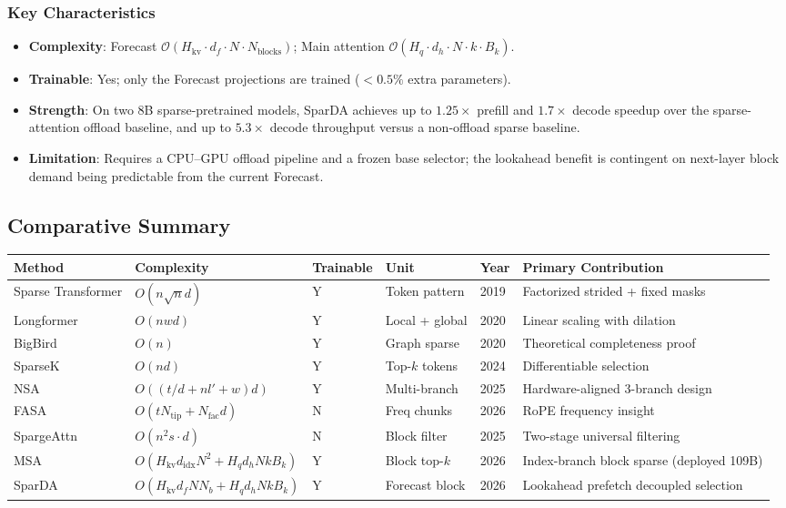 \subsubsection{Key Characteristics}

\begin{itemize}[leftmargin=*]
    \item \textbf{Complexity}: Forecast $\mathcal{O}(H_{\text{kv}} \cdot d_f \cdot N \cdot N_{\text{blocks}})$; Main attention $\mathcal{O}(H_q \cdot d_h \cdot N \cdot k \cdot B_k)$.
    \item \textbf{Trainable}: Yes; only the Forecast projections are trained ($<0.5\%$ extra parameters).
    \item \textbf{Strength}: On two 8B sparse-pretrained models, SparDA achieves up to $1.25\times$ prefill and $1.7\times$ decode speedup over the sparse-attention offload baseline, and up to $5.3\times$ decode throughput versus a non-offload sparse baseline.
    \item \textbf{Limitation}: Requires a CPU--GPU offload pipeline and a frozen base selector; the lookahead benefit is contingent on next-layer block demand being predictable from the current Forecast.
\end{itemize}

\subsection{Comparative Summary}

\footnotesize
\begin{longtable}{p{1.9cm}p{1.7cm}p{1.6cm}p{1.6cm}p{1.1cm}p{3.5cm}}
\toprule
\textbf{Method} & \textbf{Complexity} & \textbf{Trainable} & \textbf{Unit} & \textbf{Year} & \textbf{Primary Contribution} \\
\midrule
\endhead
Sparse Transformer & $O(n\sqrt{n}d)$ & Y & Token pattern & 2019 & Factorized strided + fixed masks \\
Longformer & $O(nwd)$ & Y & Local + global & 2020 & Linear scaling with dilation \\
BigBird & $O(n)$ & Y & Graph sparse & 2020 & Theoretical completeness proof \\
SparseK & $O(nd)$ & Y & Top-$k$ tokens & 2024 & Differentiable selection \\
NSA & $O((t/d+nl'+w)d)$ & Y & Multi-branch & 2025 & Hardware-aligned 3-branch design \\
FASA & $O(tN_{\text{tip}}+N_{\text{fac}}d)$ & N & Freq chunks & 2026 & RoPE frequency insight \\
SpargeAttn & $O(n^2 s \cdot d)$ & N & Block filter & 2025 & Two-stage universal filtering \\
MSA & $O(H_{\text{kv}}d_{\text{idx}}N^2 + H_q d_h N k B_k)$ & Y & Block top-$k$ & 2026 & Index-branch block sparse (deployed 109B) \\
SparDA & $O(H_{\text{kv}}d_f N N_b + H_q d_h N k B_k)$ & Y & Forecast block & 2026 & Lookahead prefetch decoupled selection \\
\bottomrule
\end{longtable}
\normalsize

